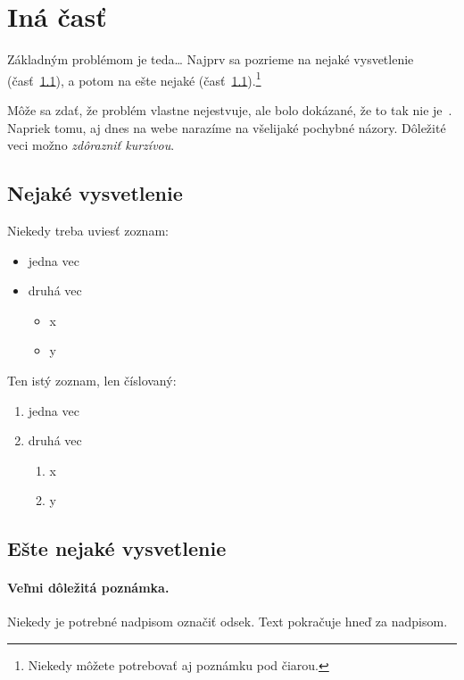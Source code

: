\documentclass[10pt,twoside,slovak,a4paper]{coursepaper}
\begin{document}
\section{Iná časť} \label{ina}

Základným problémom je teda\ldots{} Najprv sa pozrieme na nejaké vysvetlenie (časť~\ref{ina:nejake}), a potom na ešte nejaké (časť~\ref{ina:nejake}).\footnote{Niekedy môžete potrebovať aj poznámku pod čiarou.}

Môže sa zdať, že problém vlastne nejestvuje\cite{Coplien:MPD}, ale bolo dokázané, že to tak nie je~\cite{Czarnecki:Staged, Czarnecki:Progress}. Napriek tomu, aj dnes na webe narazíme na všelijaké pochybné názory\cite{PLP-Framework}. Dôležité veci možno \emph{zdôrazniť kurzívou}.


\subsection{Nejaké vysvetlenie} \label{ina:nejake}

Niekedy treba uviesť zoznam:

\begin{itemize}
\item jedna vec
\item druhá vec
	\begin{itemize}
	\item x
	\item y
	\end{itemize}
\end{itemize}

Ten istý zoznam, len číslovaný:

\begin{enumerate}
\item jedna vec
\item druhá vec
	\begin{enumerate}
	\item x
	\item y
	\end{enumerate}
\end{enumerate}


\subsection{Ešte nejaké vysvetlenie} \label{ina:este}

\paragraph{Veľmi dôležitá poznámka.}
Niekedy je potrebné nadpisom označiť odsek. Text pokračuje hneď za nadpisom.
\end{document}
